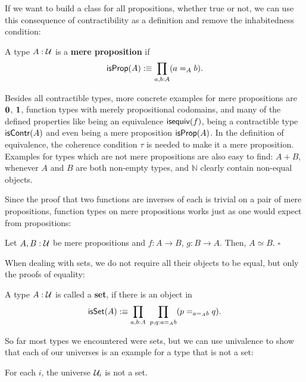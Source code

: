 If we want to build a class for all propositions, whether true or not, we can use
this consequence of contractibility as a definition and remove the inhabitedness
condition:
\begin{defn}
A type $A : \mathcal{U}$ is a \textbf{mere proposition} if
\begin{equation*}
\mathsf{isProp}(A) :\equiv \prod_{a, b : A} (a =_A b) \text{.}
\end{equation*}
\end{defn}

Besides all contractible types, more concrete examples for mere propositions are $\mathbf{0}$, 
$\mathbf{1}$, function types with merely propositional codomains, and many of the
defined properties like being an equivalence $\mathsf{isequiv}(f)$, being a contractible
type $\mathsf{isContr}(A)$ and even being a mere proposition $\mathsf{isProp}(A)$.
In the definition of equivalence, the coherence condition $\tau$ is needed
to make it a mere proposition.
Examples for types which are not mere propositions are also easy to find:
$A + B$, whenever $A$ and $B$ are both non-empty types, and $\mathbb{N}$ clearly
contain non-equal objects.

Since the proof that two functions are inverses of each is trivial on a pair of
mere propositions, function types on mere propositions works just as one would
expect from propositions:
\begin{lemma}
Let $A, B : \mathcal{U}$ be mere propositions and $f : A \to B$, $g : B \to A$.
Then, $A \simeq B$. \hfill $\square$
\end{lemma}

When dealing with sets, we do not require all their objects to be equal, but
only the proofs of equality:
\begin{defn}[Sets]
A type $A : \mathcal{U}$ is called a \textbf{set}, if there is an object in
\begin{equation*}
\mathsf{isSet}(A) :\equiv \prod_{a, b : A} ~ \prod_{p, q : a =_A b} (p =_{a =_A b} q) \text{.}
\end{equation*}
\end{defn}

So far most types we encountered were sets, but we can use univalence to show
that each of our universes is an example for a type that is not a set:
\begin{lemma}
For each $i$, the universe $\mathcal{U}_i$ is not a set.
\end{lemma}

